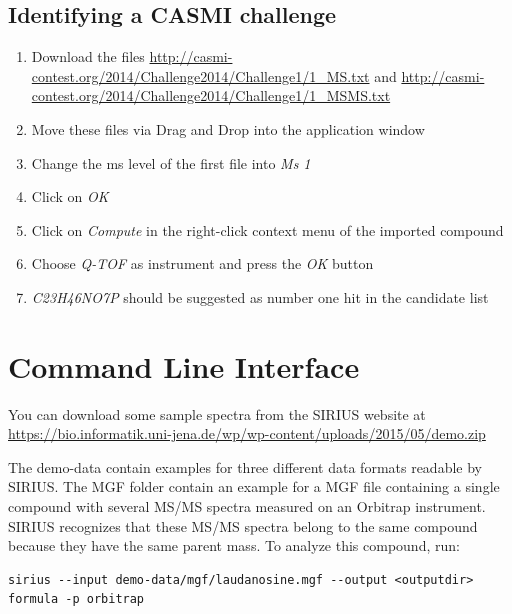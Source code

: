 \documentclass[letterpaper,10pt,openany,oneside]{sphinxmanual}
\newcommand\gui[1]{\textsl{\guilsinglleft#1\guilsinglright\xspace}}
\begin{document}
\subsection{Identifying a CASMI challenge}
\label{gui:identifying-a-casmi-challenge}
\begin{enumerate}
	\item {} 
	Download the files \url{http://casmi-contest.org/2014/Challenge2014/Challenge1/1\_MS.txt} and \url{http://casmi-contest.org/2014/Challenge2014/Challenge1/1\_MSMS.txt}
	
	\item {} 
	Move these files via Drag and Drop into the application window
	
	\item {} 
	Change the ms level of the first file into \gui{Ms 1}
	
	\item {} 
	Click on \gui{OK}
	
	\item {} 
	Click on \gui{Compute} in the right-click context menu of the imported compound
	
	\item {} 
	Choose \gui{Q-TOF} as instrument and press the \gui{OK} button
	
	\item {} 
	\emph{C23H46NO7P} should be suggested as number one hit in the candidate list
	
\end{enumerate}


\section{Command Line Interface}
\label{commandline:demo-data}

You can download some sample spectra from the SIRIUS website
at \url{https://bio.informatik.uni-jena.de/wp/wp-content/uploads/2015/05/demo.zip}

The demo-data contain examples for three different data formats readable by
SIRIUS. The MGF folder contain an example for a MGF file containing a single
compound with several MS/MS spectra measured on an Orbitrap
instrument. SIRIUS recognizes that these MS/MS spectra belong to the same
compound because they have the same parent mass. To analyze this compound,
run:
%
\begin{Verbatim}[commandchars=\\\{\}]
sirius --input demo-data/mgf/laudanosine.mgf --output <outputdir>  formula -p orbitrap 
\end{Verbatim}
\end{document}
